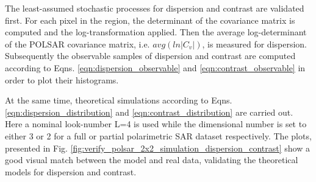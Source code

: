 \documentclass[journal]{IEEEtran}
\begin{document}
%  

The least-assumed stochastic processes for dispersion and contrast are validated first.
For each pixel in the region, the determinant of the covariance matrix is computed and the log-transformation applied.
Then the average log-determinant of the POLSAR covariance matrix, i.e. $avg(ln|C_v|)$, is measured for dispersion.
Subsequently the observable samples of dispersion and contrast are computed according to Eqns. \ref{eqn:dispersion_observable} and \ref{eqn:contrast_observable} in order to plot their histograms.

At the same time, theoretical simulations according to Eqns. \ref{eqn:dispersion_distribution} and \ref{eqn:contrast_distribution} are carried out.
Here a nominal look-number L=4 is used
  while the dimensional number is set to either 3 or 2 for a full or partial polarimetric SAR dataset respectively.
The plots, presented in Fig.
  \ref {fig:verify_polsar_2x2_simulation_dispersion_contrast} show a good  visual match between the model and real data, validating the theoretical models for dispersion and contrast.
\end{document}
